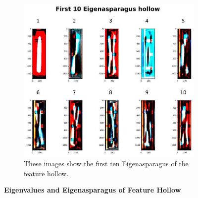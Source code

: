 \begin{figure}[!h]
	\begin{subfigure}{0.9\textwidth}
		\includegraphics[width=0.9\linewidth]{Figures/chapter04/pca_hollow.png}
		\caption{These images show the first ten Eigenasparagus of the feature hollow.}
	\end{subfigure}
    \caption[First Ten Eigenvalues and Eigenasparagus of Feature Hollow]{\textbf{Eigenvalues and Eigenasparagus of Feature Hollow}}
    \label{fig:PCAhollow}
\end{figure}



